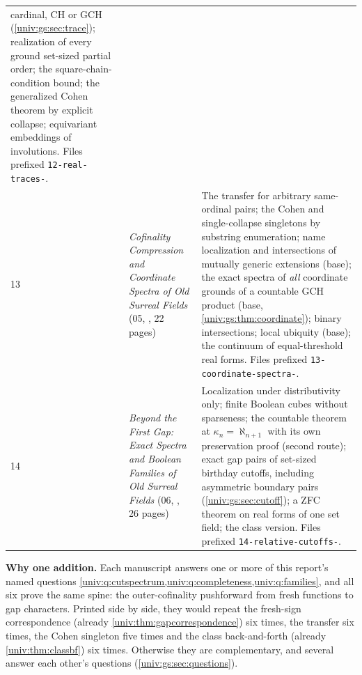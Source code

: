 \documentclass[11pt,letterpaper]{article}
\numberwithin{equation}{section}
\theoremstyle{definition}
\theoremstyle{remark}
\begin{document}
{\begin{longtable}{@{}P{0.07\textwidth}P{0.34\textwidth}P{0.51\textwidth}@{}}
cardinal, CH or GCH (\cref{univ:gs:sec:trace}); realization of every ground
set-sized partial order; the square-chain-condition bound; the generalized
Cohen theorem by explicit collapse; equivariant embeddings of involutions.
Files prefixed \texttt{12-real-traces-}.\\
13 & \emph{Cofinality Compression and Coordinate Spectra of Old Surreal Fields}
(05, , 22 pages) & The transfer for
arbitrary same-ordinal pairs; the Cohen and single-collapse singletons by
substring enumeration; name localization and intersections of mutually generic
extensions (base); the exact spectra of \emph{all} coordinate grounds of a
countable GCH product (base, \cref{univ:gs:thm:coordinate}); binary
intersections; local ubiquity (base); the continuum of equal-threshold real
forms. Files prefixed \texttt{13-coordinate-spectra-}.\\
14 & \emph{Beyond the First Gap: Exact Spectra and Boolean Families of Old
Surreal Fields} (06, , 26 pages) &
Localization under distributivity only; finite Boolean cubes without
sparseness; the countable theorem at $\kappa_n=\aleph_{n+1}$ with its own
preservation proof (second route); exact gap pairs of set-sized birthday
cutoffs, including asymmetric boundary pairs (\cref{univ:gs:sec:cutoff}); a
ZFC theorem on real forms of one set field; the class version. Files prefixed
\texttt{14-relative-cutoffs-}.\\
\bottomrule
\end{longtable}}

\textbf{Why one addition.} Each manuscript answers one or more of this report's
named questions \cref{univ:q:cutspectrum,univ:q:completeness,univ:q:families},
and all six prove the same spine: the outer-cofinality pushforward from fresh
functions to gap characters. Printed side by side, they would repeat the
fresh-sign correspondence (already \cref{univ:thm:gapcorrespondence}) six times,
the transfer six times, the Cohen singleton five times and the class
back-and-forth (already \cref{univ:thm:classbf}) six times. Otherwise they are
complementary, and several answer each other's questions
(\cref{univ:gs:sec:questions}).
\end{document}
